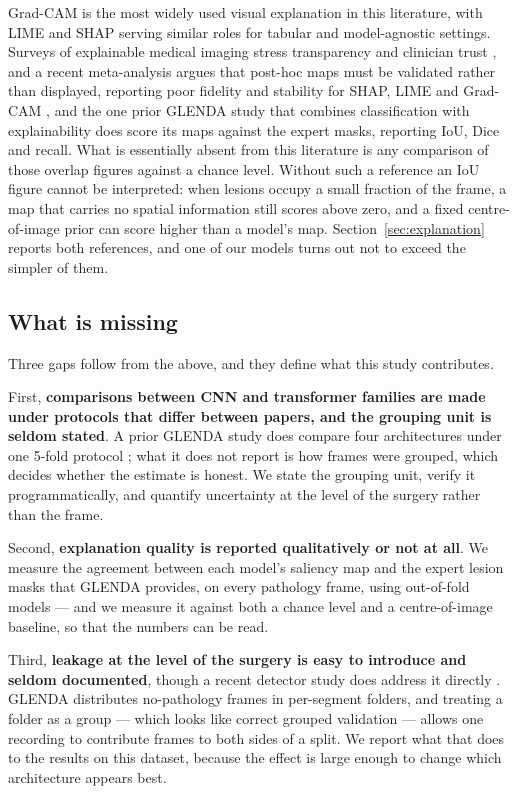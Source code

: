 \documentclass[preprint,12pt]{elsarticle}
\begin{document}
Grad-CAM \cite{ref_gradcam} is the most widely used visual explanation in this literature, with LIME \cite{ref_lime} and SHAP \cite{ref_shap} serving similar roles for tabular and model-agnostic settings. Surveys of explainable medical imaging stress transparency and clinician trust \cite{ref_x4}, and a recent meta-analysis argues that post-hoc maps must be validated rather than displayed, reporting poor fidelity and stability for SHAP, LIME and Grad-CAM \cite{ref_x5}, and the one prior GLENDA study that combines classification with explainability \cite{ref_a1} does score its maps against the expert masks, reporting IoU, Dice and recall. What is essentially absent from this literature is any comparison of those overlap figures against a chance level. Without such a reference an IoU figure cannot be interpreted: when lesions occupy a small fraction of the frame, a map that carries no spatial information still scores above zero, and a fixed centre-of-image prior can score higher than a model's map. Section~\ref{sec:explanation} reports both references, and one of our models turns out not to exceed the simpler of them.

\subsection{What is missing}

Three gaps follow from the above, and they define what this study contributes.

First, \textbf{comparisons between CNN and transformer families are made under protocols that differ between papers, and the grouping unit is seldom stated}. A prior GLENDA study does compare four architectures under one 5-fold protocol \cite{ref_a1}; what it does not report is how frames were grouped, which decides whether the estimate is honest. We state the grouping unit, verify it programmatically, and quantify uncertainty at the level of the surgery rather than the frame.

Second, \textbf{explanation quality is reported qualitatively or not at all}. We measure the agreement between each model's saliency map and the expert lesion masks that GLENDA provides, on every pathology frame, using out-of-fold models --- and we measure it against both a chance level and a centre-of-image baseline, so that the numbers can be read.

Third, \textbf{leakage at the level of the surgery is easy to introduce and seldom documented}, though a recent detector study does address it directly \cite{ref_a6}. GLENDA distributes no-pathology frames in per-segment folders, and treating a folder as a group --- which looks like correct grouped validation --- allows one recording to contribute frames to both sides of a split. We report what that does to the results on this dataset, because the effect is large enough to change which architecture appears best.
\end{document}
